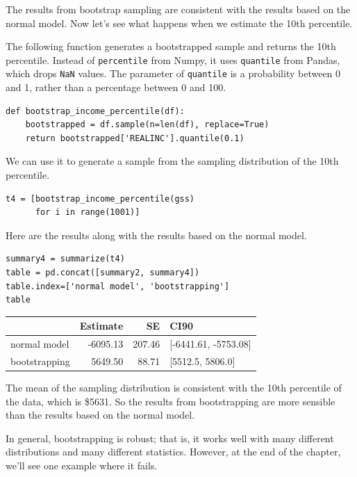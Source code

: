 The results from bootstrap sampling are consistent with the results
based on the normal model. Now let's see what happens when we estimate
the 10th percentile.

The following function generates a bootstrapped sample and returns the
10th percentile. Instead of \passthrough{\lstinline!percentile!} from
Numpy, it uses \passthrough{\lstinline!quantile!} from Pandas, which
drops \passthrough{\lstinline!NaN!} values. The parameter of
\passthrough{\lstinline!quantile!} is a probability between 0 and 1,
rather than a percentage between 0 and 100.

\begin{lstlisting}[]
def bootstrap_income_percentile(df):
    bootstrapped = df.sample(n=len(df), replace=True)
    return bootstrapped['REALINC'].quantile(0.1)
\end{lstlisting}

We can use it to generate a sample from the sampling distribution of the
10th percentile.

\begin{lstlisting}[]
t4 = [bootstrap_income_percentile(gss)
      for i in range(1001)]
\end{lstlisting}

Here are the results along with the results based on the normal model.

\begin{lstlisting}[]
summary4 = summarize(t4)
table = pd.concat([summary2, summary4])
table.index=['normal model', 'bootstrapping']
table
\end{lstlisting}

\begin{tabular}{lrrl}
\midrule
{} &  Estimate &      SE &                  CI90 \\
\midrule
normal model  &  -6095.13 &  207.46 &  [-6441.61, -5753.08] \\
bootstrapping &   5649.50 &   88.71 &      [5512.5, 5806.0] \\
\midrule
\end{tabular}

The mean of the sampling distribution is consistent with the 10th
percentile of the data, which is \$5631. So the results from
bootstrapping are more sensible than the results based on the normal
model.

In general, bootstrapping is robust; that is, it works well with many
different distributions and many different statistics. However, at the
end of the chapter, we'll see one example where it fails.

